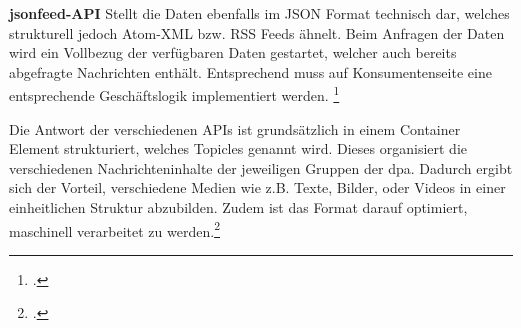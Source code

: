 \textbf{jsonfeed-API}
Stellt die Daten ebenfalls im JSON Format technisch dar, welches strukturell jedoch Atom-XML bzw. RSS Feeds ähnelt. Beim Anfragen der Daten wird ein Vollbezug der verfügbaren Daten gestartet, welcher auch bereits abgefragte Nachrichten enthält. Entsprechend muss auf Konsumentenseite eine entsprechende Geschäftslogik implementiert werden. \footcite[Vgl.][]{DpaApiDocumentation.APIs.2024}
\newpage

Die Antwort der verschiedenen APIs ist grundsätzlich in einem Container Element strukturiert, welches Topicles genannt wird. Dieses organisiert die verschiedenen Nachrichteninhalte der jeweiligen Gruppen der dpa. Dadurch ergibt sich der Vorteil, verschiedene Medien wie z.B. Texte, Bilder, oder Videos in einer einheitlichen Struktur abzubilden. Zudem ist das Format darauf optimiert, maschinell verarbeitet zu werden.\footcite[Vgl.][]{DpaApiDocumentation.Format.2024}

